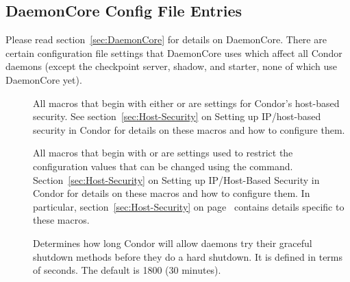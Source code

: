 \subsection{\label{sec:DaemonCore-Config-File-Entries}DaemonCore Config File Entries} 

Please read section~\ref{sec:DaemonCore} for details
on DaemonCore.  There are certain configuration file settings that
DaemonCore uses which affect all Condor daemons (except the checkpoint
server, shadow, and starter, none of which use DaemonCore yet).
\begin{description}
  
\item[] \label{param:HostAllow} All
  macros that begin with either  or
   are settings for Condor's host-based security.
  See section~\ref{sec:Host-Security} on Setting up
  IP/host-based security in Condor for details on these
  macros and how to configure them.

\item[] \label{param:SettableAttrs} All
  macros that begin with  or
   are settings used to restrict the 
  configuration values that can be changed using the  
  command.
  Section~\ref{sec:Host-Security} on Setting up
  IP/Host-Based Security in Condor for details on these
  macros and how to configure them.  
  In particular, section~\ref{sec:Host-Security}
  on page~\pageref{sec:Host-Security} contains details specific to
  these macros.

\item[]
  \label{param:ShutdownGracefulTimeout} Determines how long
  Condor will allow daemons try their graceful shutdown methods
  before they do a hard shutdown.  It is defined in terms of seconds.
  The default is 1800 (30 minutes).


\end{description}
